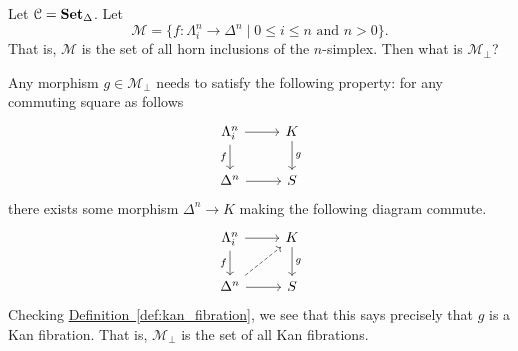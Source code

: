 \documentclass[main.tex]{subfiles}
\begin{document}
\begin{example}
  \label{eg:kan_fibrations_are_have_rlp_wrt_horn_fillings}
  Let $\mathcal{C} = \operatorname{\mathbf{Set}_{\Delta}}$. Let
  \begin{equation*}
    \mathcal{M} = \{f\colon \Lambda^{n}_{i} \to \Delta^{n} \mid 0 \leq i \leq n \text{ and } n > 0\}.
  \end{equation*}
  That is, $\mathcal{M}$ is the set of all horn inclusions of the $n$-simplex. Then what is $\mathcal{M}_{\perp}$?

  Any morphism $g \in \mathcal{M}_{\perp}$ needs to satisfy the following property: for any commuting square as follows
  \begin{equation*}
    \begin{tikzcd}
      \Lambda^{n}_{i}
      \arrow[r]
      \arrow[d, swap, "f"]
      & K
      \arrow[d, "g"]
      \\
      \Delta^{n}
      \arrow[r]
      & S
    \end{tikzcd}
  \end{equation*}
  there exists some morphism $\Delta^{n} \to K$ making the following diagram commute.
  \begin{equation*}
    \begin{tikzcd}
      \Lambda^{n}_{i}
      \arrow[r]
      \arrow[d, swap, "f"]
      & K
      \arrow[d, "g"]
      \\
      \Delta^{n}
      \arrow[ur, dashed]
      \arrow[r]
      & S
    \end{tikzcd}
  \end{equation*}
  Checking \hyperref[def:kan_fibration]{Definition~\ref*{def:kan_fibration}}, we see that this says precisely that $g$ is a Kan fibration. That is, $\mathcal{M}_{\perp}$ is the set of all Kan fibrations.
\end{example}
\end{document}
